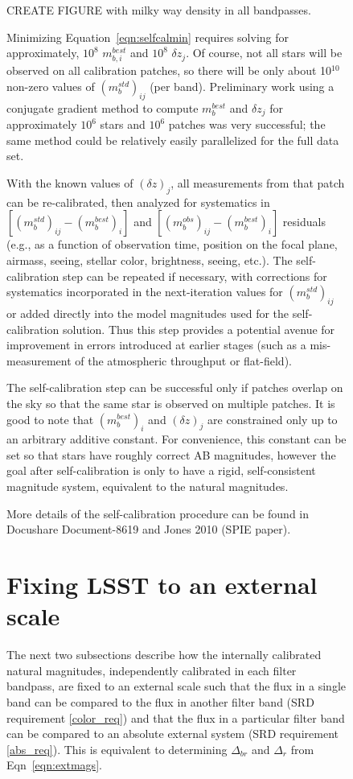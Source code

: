 \documentclass[12pt,preprint]{aastex}
\begin{document}
\begin{figure}[htbp]
{CREATE FIGURE with milky way density in all bandpasses.

Minimizing Equation~\ref{eqn:selfcalmin} requires solving for
approximately, $10^8$ $m_{b,i}^{best}$ and $10^8$ $\delta z_j$. Of
course, not all stars will be observed on all calibration patches, so
there will be only about 10$^{10}$ non-zero values of
$(m_b^{std})_{ij}$ (per band). Preliminary work using a conjugate
gradient method to compute $m_{b}^{best}$ and $\delta z_j$ for
approximately $10^6$ stars and $10^6$ patches was very successful; the
same method could be relatively easily parallelized for the full data
set. 

With the known values of $(\delta z)_j$, all measurements from that
patch can be re-calibrated, then analyzed for systematics in
$[(m_b^{std})_{ij} - (m_b^{best})_{i}]$ and $[(m_b^{obs})_{ij} -
(m_b^{best})_{i}]$ residuals (e.g., as a function of observation time,
position on the focal plane, airmass, seeing, stellar color,
brightness, seeing, etc.). The self-calibration step can be repeated
if necessary, with corrections for systematics incorporated in the
next-iteration values for $(m_b^{std})_{ij}$ or added directly into
the model magnitudes used for the self-calibration solution. Thus this
step provides a potential avenue for improvement in errors introduced
at earlier stages (such as a mis-measurement of the atmospheric
throughput or flat-field). 

The self-calibration step can be successful only if patches
overlap on the sky so that the same star is observed on 
multiple patches. It is good to note that $(m_b^{best})_{i}$ and 
$(\delta z)_j$ are constrained only up to an arbitrary 
additive constant. For convenience, this constant can be set so that
stars have roughly correct AB magnitudes, however the goal after
self-calibration is only to have a rigid, self-consistent magnitude
system, equivalent to the natural magnitudes.

More details of the self-calibration procedure can be found in
Docushare Document-8619 and Jones 2010 (SPIE paper). 


\section{Fixing LSST to an external scale}

The next two subsections describe how the internally calibrated
natural magnitudes, independently calibrated in each filter bandpass, are fixed
to an external scale such that the flux in a single band can be compared to the
flux in another filter band (SRD requirement \ref{color_req}) and that
the flux in a particular filter band can be compared to an absolute
external system (SRD requirement \ref{abs_req}). This is equivalent to
determining $\Delta_{br}$ and $\Delta_r$ from Eqn~\ref{eqn:extmags}. 

}
\end{figure}
\end{document}
